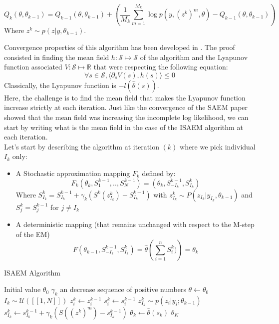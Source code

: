 \documentclass{article}
\theoremstyle{plain}
\theoremstyle{plain}
\theoremstyle{definition}
\begin{document}
\begin{equation}
Q_k(\theta,\theta_{k-1}) = Q_{k-1}(\theta,\theta_{k-1}) + (\frac{1}{M_k}\sum_{m=1}^{M_k}{\log p(y,(z^k)^m,\theta)} - Q_{k-1}(\theta,\theta_{k-1}))
\end{equation}
Where $z^k \sim p(z|y,\theta_{k-1})$.

Convergence properties of this algorithm has been developed in \citep{lavielle}. The proof consisted in finding the mean field $h: \mathcal{S} \mapsto \mathcal{S}$ of the algorithm and the Lyapunov function associated $V: \mathcal{S} \mapsto \mathbb{R}$ that were respecting the following equation:
\begin{equation}
\forall s \in \mathcal{S}, \langle \partial_s V(s), h(s) \rangle \leq 0
\end{equation}
Classically, the Lyapunov function is $-l(\hat{\theta}(s))$.\\
Here, the challenge is to find the mean field that makes the Lyapunov function increase strictly at each iteration.
Just like the convergence of the SAEM paper showed that the mean field was increasing the incomplete log likelihood, we can start by writing what is the mean field in the case of the ISAEM algorithm at each iteration.\\
Let's start by describing the algorithm at iteration $(k)$ where we pick individual $I_k$ only:

\begin{itemize}
  \item A Stochastic approximation mapping $F_{k}$ defined by:
  \begin{equation}
    F_{k}(\theta_{k}, S_1^{k-1},..,S_N^{k-1}) = (\theta_{k}, S_{-I_k}^{k-1},S_{I_k}^{k})
  \end{equation}
  Where $S_{I_k}^{k} = S_{I_k}^{k-1} + \gamma_{k}(S^{k}(z_{I_k}^{k})-S_{I_k}^{k-1})$ with $z_{I_k}^{k} \sim P(z_{I_k}|y_{I_k},\theta_{k-1})$ and $S_j^{k} = S_j^{k-1}$ for $j \neq I_k$
  \item A deterministic mapping (that remains unchanged with respect to the M-step of the EM)
  \begin{equation}
    F(\theta_{k-1}, S_{-{I_k}}^{k-1},S_{I_k}^{k}) = \hat{\theta}(\sum_{i=1}^{n}{S_i^{k})}) = \theta_{k}
  \end{equation}
\end{itemize}

\begin{algorithm}
\caption{ISAEM Algorithm}
\label{pseudoISAEM}
\begin{algorithmic}[1]
\State Initial value $\theta_0$
\State $\gamma_k$ an decrease sequence of positive numbers
\State $\theta \gets \theta_0$
\State $I_{k} \sim  \mathcal{U}([\![1,N]\!])$
        \State $z_i^{k} \gets z_i^{k-1}$
        \State $s_i^{k} \gets s_i^{k-1}$
      \Else
        \State $z_{I_{k}}^{k} \sim p(z_i|y_i; \theta_{k-1})$
        \State $s_{I_{k}}^{k} \gets s_{I_{k}}^{k-1} + \gamma_k (S((z^{k})^m)-s_{I_{k}}^{k-1})$
      \EndIf
        \State $\theta_{k} \gets \hat{\theta}(s_{k})$  
\EndFor  
\State \Return $\theta_{K}$
\end{algorithmic}
\end{algorithm}
\newpage
\end{document}
